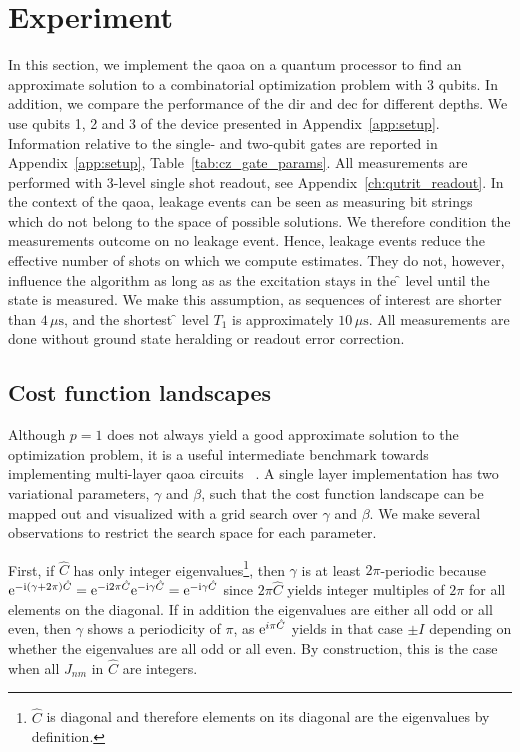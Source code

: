 \section{Experiment} \label{sec:qaoa_experiment}
In this section, we implement the \gls{qaoa} on a quantum processor to find an approximate solution to a combinatorial optimization problem with 3 qubits. In addition, we compare the performance of the \gls{dir} and \gls{dec} for different depths. We use qubits 1, 2 and 3 of the device presented in Appendix~\ref{app:setup}. Information relative to the single- and two-qubit gates are reported in Appendix~\ref{app:setup}, Table~\ref{tab:cz_gate_params}. All measurements are performed with 3-level single shot readout, see Appendix~\ref{ch:qutrit_readout}. In the context of the \gls{qaoa}, leakage events can be seen as measuring bit strings which do not belong to the space of possible solutions. We therefore condition the measurements outcome on no leakage event. Hence, leakage events reduce the effective number of shots on which we compute estimates. They do not, however, influence the algorithm as long as as the excitation stays in the \f{} level until the state is measured. We make this assumption, as sequences of interest are shorter than $4\,\mu\text{s}$, and the shortest \f{} level $T_1$ is approximately $10\,\mu\text{s}$. All measurements are done without ground state heralding or readout error correction.

\subsection{Cost function landscapes}
Although $p=1$ does not always yield a good approximate solution to the optimization problem, it is a useful intermediate benchmark towards implementing multi-layer \gls{qaoa} circuits ~\cite{Pagano2019QuantumSimulator, Bengtsson2019QuantumProcessor}. A single layer implementation has two variational parameters, $\gamma$ and $\beta$, such that the cost function landscape can be mapped out and visualized with a grid search over $\gamma$ and $\beta$. We make several observations to restrict the search space for each parameter. 

First, if $\hat C$ has only integer eigenvalues\footnote{$\hat C$ is diagonal and therefore elements on its diagonal are the eigenvalues by definition.}, then $\gamma$ is at least $2\pi$-periodic because $\mathrm e^{-\mathrm i(\gamma + 2\pi) \hat C} = \mathrm e^{-\mathrm i 2\pi \hat C} \mathrm e^{-\mathrm i \gamma \hat C} = \mathrm e^{-\mathrm i \gamma \hat C}$ since $2\pi \hat C$ yields integer multiples of $2\pi$ for all elements on the diagonal. If in addition the eigenvalues are either all odd or all even, then $\gamma$ shows a periodicity of $\pi$, as $\mathrm e^{i\pi\hat C}$ yields in that case $\pm I$ depending on whether the eigenvalues are all odd or all even. By construction, this is the case when all $J_{nm}$ in $\hat C$ are integers. 

